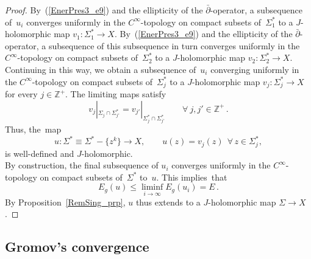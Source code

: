 \documentclass[11pt]{article}
\numberwithin{equation}{section}
\theoremstyle{definition}
\def\eref#1{(\ref{#1})}
\def\lra{\longrightarrow}
\def\Z{{\mathbb Z}}
\def\Si{\Sigma}
\def\i{\infty}
\def\dbar{\bar\partial}
\begin{document}
\begin{proof}
\noindent
By~\eref{EnerPres3_e9} and the ellipticity of the $\dbar$-operator, 
a subsequence of~$u_i$ converges  uniformly in the $C^{\i}$-topology on compact subsets of~$\Si_1^*$
to a $J$-holomorphic map \hbox{$v_1\!:\Si_1^*\!\lra\!X$}.
By~\eref{EnerPres3_e9} and the ellipticity of the $\dbar$-operator,
a subsequence of this subsequence in turn converges  uniformly 
in the $C^{\i}$-topology on compact subsets of~$\Si_2^*$
to a $J$-holomorphic map \hbox{$v_2\!:\Si_2^*\!\lra\!X$}.
Continuing in this way,  we obtain a subsequence of~$u_i$ 
converging  uniformly  in the $C^{\i}$-topology on compact subsets of~$\Si_j^*$
to a $J$-holomorphic map \hbox{$v_j\!:\Si_j^*\!\lra\!X$} for every $j\!\in\!\Z^+$.
The limiting maps satisfy
$$v_j|_{\Si_j\cap\Si_{j'}^*}=v_{j'}|_{\Si_j^*\cap\Si_{j'}^*}
\qquad\forall~j,j'\!\in\!\Z^+\,.$$ 
Thus, the~map
$$u\!:\Si^*\!\equiv\!\Si^*\!-\!\big\{z^k\big\}\lra X, \qquad
u(z)=v_j(z)~~\forall\,z\!\in\!\Si_j^*,%
$$
is well-defined and $J$-holomorphic.\\

\noindent
By construction, the final subsequence of $u_i$ converges  uniformly 
in the $C^{\i}$-topology on compact subsets of~$\Si^*$ to~$u$.
This implies~that
$$E_g(u)\le \liminf_{i\lra\i}E_g(u_i)=E\,.$$
By Proposition~\ref{RemSing_prp}, $u$ thus extends to a $J$-holomorphic map $\Si\!\lra\!X$.
\end{proof}






\subsection{Gromov's convergence}
\label{Conver_subs2}
\end{document}
